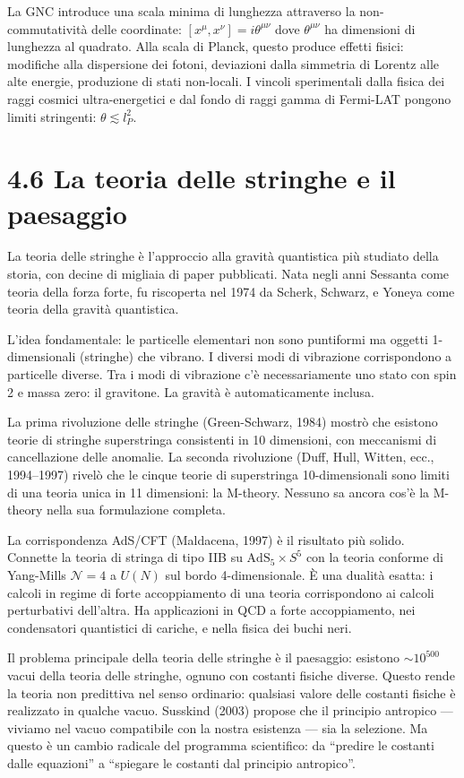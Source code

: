 \documentclass[11.5pt,a4paper,openany]{book}
\theoremstyle{remark}
\begin{document}
La GNC introduce una scala minima di lunghezza attraverso la non-commutatività delle coordinate: $[x^\mu, x^\nu] = i\theta^{\mu\nu}$ dove $\theta^{\mu\nu}$ ha dimensioni di lunghezza al quadrato. Alla scala di Planck, questo produce effetti fisici: modifiche alla dispersione dei fotoni, deviazioni dalla simmetria di Lorentz alle alte energie, produzione di stati non-locali. I vincoli sperimentali dalla fisica dei raggi cosmici ultra-energetici e dal fondo di raggi gamma di Fermi-LAT pongono limiti stringenti: $\theta \lesssim l_P^2$.

\section{4.6 La teoria delle stringhe e il paesaggio}

La teoria delle stringhe è l'approccio alla gravità quantistica più studiato della storia, con decine di migliaia di paper pubblicati. Nata negli anni Sessanta come teoria della forza forte, fu riscoperta nel 1974 da Scherk, Schwarz, e Yoneya come teoria della gravità quantistica.

L'idea fondamentale: le particelle elementari non sono puntiformi ma oggetti 1-dimensionali (stringhe) che vibrano. I diversi modi di vibrazione corrispondono a particelle diverse. Tra i modi di vibrazione c'è necessariamente uno stato con spin 2 e massa zero: il gravitone. La gravità è automaticamente inclusa.

La prima rivoluzione delle stringhe (Green-Schwarz, 1984) mostrò che esistono teorie di stringhe superstringa consistenti in 10 dimensioni, con meccanismi di cancellazione delle anomalie. La seconda rivoluzione (Duff, Hull, Witten, ecc., 1994--1997) rivelò che le cinque teorie di superstringa 10-dimensionali sono limiti di una teoria unica in 11 dimensioni: la M-theory. Nessuno sa ancora cos'è la M-theory nella sua formulazione completa.

La corrispondenza AdS/CFT (Maldacena, 1997) è il risultato più solido. Connette la teoria di stringa di tipo IIB su $\mathrm{AdS}_5 \times S^5$ con la teoria conforme di Yang-Mills $\mathcal{N}=4$ a $U(N)$ sul bordo 4-dimensionale. È una dualità esatta: i calcoli in regime di forte accoppiamento di una teoria corrispondono ai calcoli perturbativi dell'altra. Ha applicazioni in QCD a forte accoppiamento, nei condensatori quantistici di cariche, e nella fisica dei buchi neri.

Il problema principale della teoria delle stringhe è il paesaggio: esistono $\sim 10^{500}$ vacui della teoria delle stringhe, ognuno con costanti fisiche diverse. Questo rende la teoria non predittiva nel senso ordinario: qualsiasi valore delle costanti fisiche è realizzato in qualche vacuo. Susskind (2003) propose che il principio antropico --- viviamo nel vacuo compatibile con la nostra esistenza --- sia la selezione. Ma questo è un cambio radicale del programma scientifico: da ``predire le costanti dalle equazioni'' a ``spiegare le costanti dal principio antropico''.
\end{document}
